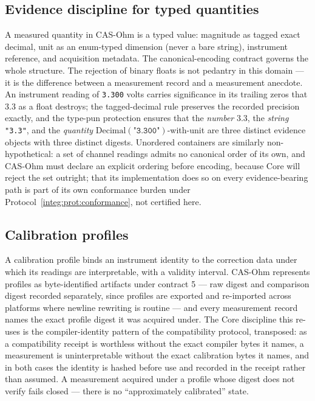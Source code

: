 \subsection{Evidence discipline for typed quantities}\label{integ:ohm:quantities}

A measured quantity in CAS-Ohm is a typed value: magnitude as tagged exact decimal, unit as an enum-typed dimension (never a bare string), instrument reference, and acquisition metadata. The canonical-encoding contract governs the whole structure. The rejection of binary floats is not pedantry in this domain --- it is the difference between a measurement record and a measurement anecdote. An instrument reading of \texttt{3.300} volts carries significance in its trailing zeros that $3.3$ as a float destroys; the tagged-decimal rule preserves the recorded precision exactly, and the type-pun protection ensures that the \emph{number} $3.3$, the \emph{string} \texttt{"3.3"}, and the \emph{quantity} $\mathrm{Decimal}(\texttt{"3.300"})$-with-unit are three distinct evidence objects with three distinct digests. Unordered containers are similarly non-hypothetical: a set of channel readings admits no canonical order of its own, and CAS-Ohm must declare an explicit ordering before encoding, because Core will reject the set outright; that its implementation does so on every evidence-bearing path is part of its own conformance burden under Protocol~\ref{integ:prot:conformance}, not certified here.

\subsection{Calibration profiles}\label{integ:ohm:calibration}

A calibration profile binds an instrument identity to the correction data under which its readings are interpretable, with a validity interval. CAS-Ohm represents profiles as byte-identified artifacts under contract 5 --- raw digest and comparison digest recorded separately, since profiles are exported and re-imported across platforms where newline rewriting is routine --- and every measurement record names the exact profile digest it was acquired under. The Core discipline this re-uses is the compiler-identity pattern of the compatibility protocol, transposed: as a compatibility receipt is worthless without the exact compiler bytes it names, a measurement is uninterpretable without the exact calibration bytes it names, and in both cases the identity is hashed before use and recorded in the receipt rather than assumed. A measurement acquired under a profile whose digest does not verify fails closed --- there is no ``approximately calibrated'' state.

